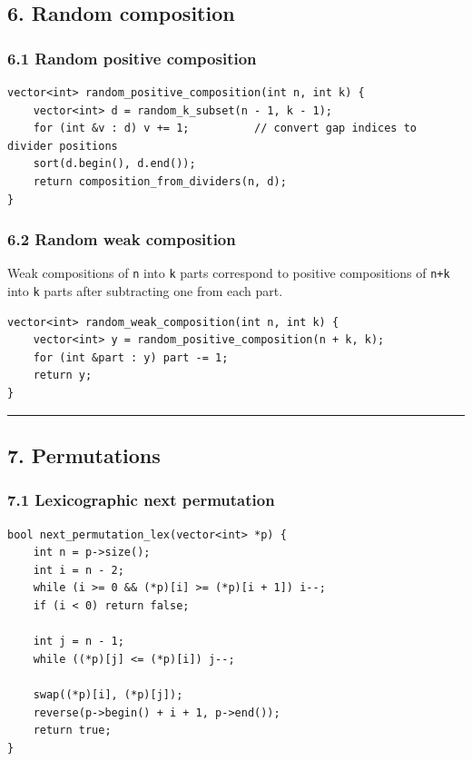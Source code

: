 \documentclass[11pt]{article}
\begin{document}
\subsection{6. Random composition}\label{random-composition}

\subsubsection{6.1 Random positive composition}\label{random-positive-composition}

\begin{verbatim}
vector<int> random_positive_composition(int n, int k) {
    vector<int> d = random_k_subset(n - 1, k - 1);
    for (int &v : d) v += 1;          // convert gap indices to divider positions
    sort(d.begin(), d.end());
    return composition_from_dividers(n, d);
}
\end{verbatim}

\subsubsection{6.2 Random weak composition}\label{random-weak-composition}

Weak compositions of \texttt{n} into \texttt{k} parts correspond to positive compositions of \texttt{n+k} into \texttt{k} parts after subtracting one from each part.

\begin{verbatim}
vector<int> random_weak_composition(int n, int k) {
    vector<int> y = random_positive_composition(n + k, k);
    for (int &part : y) part -= 1;
    return y;
}
\end{verbatim}

\begin{center}\rule{0.5\linewidth}{0.5pt}\end{center}

\subsection{7. Permutations}\label{permutations}

\subsubsection{7.1 Lexicographic next permutation}\label{lexicographic-next-permutation}

\begin{verbatim}
bool next_permutation_lex(vector<int> *p) {
    int n = p->size();
    int i = n - 2;
    while (i >= 0 && (*p)[i] >= (*p)[i + 1]) i--;
    if (i < 0) return false;

    int j = n - 1;
    while ((*p)[j] <= (*p)[i]) j--;

    swap((*p)[i], (*p)[j]);
    reverse(p->begin() + i + 1, p->end());
    return true;
}
\end{verbatim}
\end{document}
